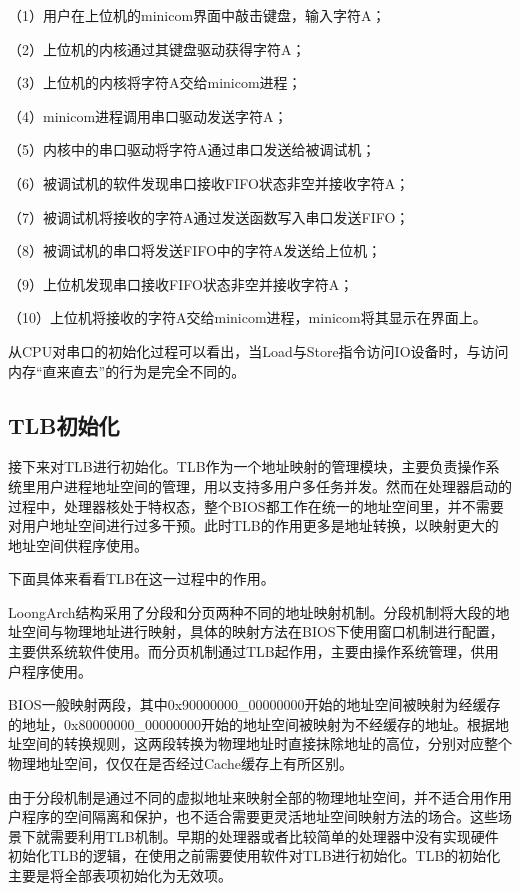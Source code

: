 \documentclass[]{ctexbook}
\begin{document}
（1）用户在上位机的minicom界面中敲击键盘，输入字符A；

（2）上位机的内核通过其键盘驱动获得字符A；

（3）上位机的内核将字符A交给minicom进程；

（4）minicom进程调用串口驱动发送字符A；

（5）内核中的串口驱动将字符A通过串口发送给被调试机；

（6）被调试机的软件发现串口接收FIFO状态非空并接收字符A；

（7）被调试机将接收的字符A通过发送函数写入串口发送FIFO；

（8）被调试机的串口将发送FIFO中的字符A发送给上位机；

（9）上位机发现串口接收FIFO状态非空并接收字符A；

（10）上位机将接收的字符A交给minicom进程，minicom将其显示在界面上。

从CPU对串口的初始化过程可以看出，当Load与Store指令访问IO设备时，与访问内存``直来直去''的行为是完全不同的。

\hypertarget{tlbux521dux59cbux5316}{%
\subsection{TLB初始化}\label{tlbux521dux59cbux5316}}

接下来对TLB进行初始化。TLB作为一个地址映射的管理模块，主要负责操作系统里用户进程地址空间的管理，用以支持多用户多任务并发。然而在处理器启动的过程中，处理器核处于特权态，整个BIOS都工作在统一的地址空间里，并不需要对用户地址空间进行过多干预。此时TLB的作用更多是地址转换，以映射更大的地址空间供程序使用。

下面具体来看看TLB在这一过程中的作用。

LoongArch结构采用了分段和分页两种不同的地址映射机制。分段机制将大段的地址空间与物理地址进行映射，具体的映射方法在BIOS下使用窗口机制进行配置，主要供系统软件使用。而分页机制通过TLB起作用，主要由操作系统管理，供用户程序使用。

BIOS一般映射两段，其中0x90000000\_00000000开始的地址空间被映射为经缓存的地址，0x80000000\_00000000开始的地址空间被映射为不经缓存的地址。根据地址空间的转换规则，这两段转换为物理地址时直接抹除地址的高位，分别对应整个物理地址空间，仅仅在是否经过Cache缓存上有所区别。

由于分段机制是通过不同的虚拟地址来映射全部的物理地址空间，并不适合用作用户程序的空间隔离和保护，也不适合需要更灵活地址空间映射方法的场合。这些场景下就需要利用TLB机制。早期的处理器或者比较简单的处理器中没有实现硬件初始化TLB的逻辑，在使用之前需要使用软件对TLB进行初始化。TLB的初始化主要是将全部表项初始化为无效项。
\end{document}
